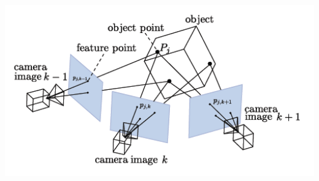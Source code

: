 \begin{frame}
\begin{columns}
\begin{column}{0.3\textwidth}
   	  \bigskip
   	  \includegraphics[width=1\textwidth]{images/sfm}\\
   	\end{column}
  \end{columns}	
\end{frame}

